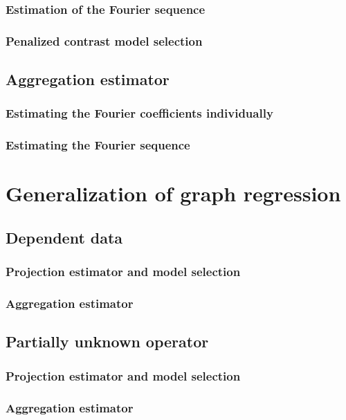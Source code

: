 \documentclass[a4paper,11pt]{book}
\theoremstyle{custom}
\begin{document}
\subsection{Estimation of the Fourier sequence}

\subsection{Penalized contrast model selection}

\section{Aggregation estimator}

\subsection{Estimating the Fourier coefficients individually}
\subsection{Estimating the Fourier sequence}


\chapter{Generalization of graph regression}
\section{Dependent data}
\subsection{Projection estimator and model selection}
\subsection{Aggregation estimator}

\section{Partially unknown operator}
\subsection{Projection estimator and model selection}
\subsection{Aggregation estimator}

{}
\nocite{*}

\end{document}
